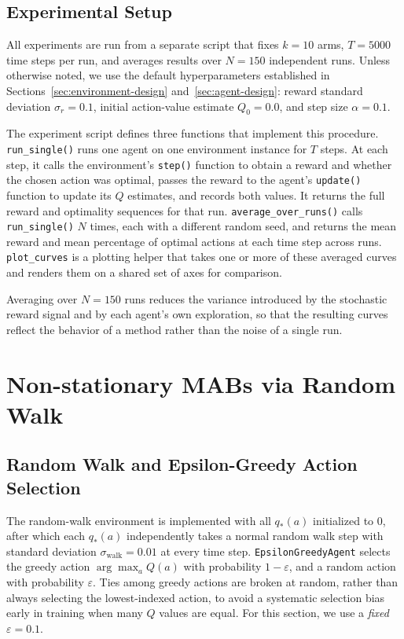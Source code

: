 \documentclass{article}
\begin{document}
\subsection{Experimental Setup}
All experiments are run from a separate script that fixes $k=10$ arms, $T=5000$
time steps per run, and averages results over $N=150$ independent runs. Unless
otherwise noted, we use the default hyperparameters established in
Sections~\ref{sec:environment-design} and~\ref{sec:agent-design}: reward
standard deviation $\sigma_r = 0.1$, initial action-value estimate $Q_0 = 0.0$,
and step size $\alpha = 0.1$.

The experiment script defines three functions that implement this procedure.
\texttt{run\_single()} runs one agent on one environment instance for $T$ steps.
At each step, it calls the environment's \texttt{step()} function to obtain a
reward and whether the chosen action was optimal, passes the reward to the
agent's \texttt{update()} function to update its $Q$ estimates, and records both
values. It returns the full reward and optimality sequences for that run.
\texttt{average\_over\_runs()} calls \texttt{run\_single()} $N$ times, each with
a different random seed, and returns the mean reward and mean percentage of
optimal actions at each time step across runs. \texttt{plot\_curves} is a
plotting helper that takes one or more of these averaged curves and renders them
on a shared set of axes for comparison.

Averaging over $N=150$ runs reduces the variance introduced by the stochastic
reward signal and by each agent's own exploration, so that the resulting curves
reflect the behavior of a method rather than the noise of a single run.

\section{Non-stationary MABs via Random Walk}
\label{sec:part1}

\subsection{Random Walk and Epsilon-Greedy Action Selection}
The random-walk environment is implemented with all $q_*(a)$ initialized to 0,
after which each $q_*(a)$ independently takes a normal random walk step with
standard deviation $\sigma_{\text{walk}} = 0.01$ at every time step.
\texttt{EpsilonGreedyAgent} selects the greedy action $\arg\max_a Q(a)$ with
probability $1-\varepsilon$, and a random action with probability $\varepsilon$.
Ties among greedy actions are broken at random, rather than always selecting the
lowest-indexed action, to avoid a systematic selection bias early in training
when many $Q$ values are equal. For this section, we use a \emph{fixed}
$\varepsilon = 0.1$.
\end{document}
